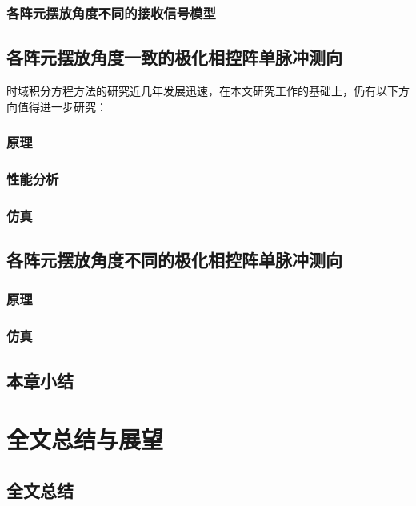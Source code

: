 \documentclass[master]{thesis-uestc}
\begin{document}
\subsection{各阵元摆放角度不同的接收信号模型}

\section{各阵元摆放角度一致的极化相控阵单脉冲测向}
时域积分方程方法的研究近几年发展迅速，在本文研究工作的基础上，仍有以下方向值得进一步研究：

\subsection{原理}

\subsection{性能分析}

\subsection{仿真}

\section{各阵元摆放角度不同的极化相控阵单脉冲测向}

\subsection{原理}

\subsection{仿真}

\section{本章小结}

\chapter{全文总结与展望}

\section{全文总结}
\end{document}
